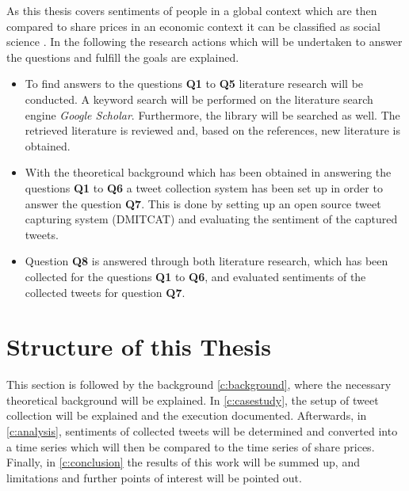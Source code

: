As this thesis covers sentiments of people in a global context which are then compared to share prices in an economic context it can be classified as social science \citep{Recker2013}.
In the following the research actions which will be undertaken to answer the questions and fulfill the goals are explained.

\begin{itemize}
	\item To find answers to the questions \textbf{Q1} to \textbf{Q5} literature research will be conducted.
	A keyword search will be performed on the literature search engine \emph{Google Scholar}.
	Furthermore, the library will be searched as well.
	The retrieved literature is reviewed and, based on the references, new literature is obtained.
	
	\item With the theoretical background which has been obtained in answering the questions \textbf{Q1} to \textbf{Q6} a tweet collection system has been set up in order to answer the question \textbf{Q7}.
	This is done by setting up an open source tweet capturing system (\ac{DMITCAT}) and evaluating the sentiment of the captured tweets.
	
	\item Question \textbf{Q8} is answered through both literature research, which has been collected for the questions \textbf{Q1} to \textbf{Q6}, and evaluated sentiments of the collected tweets for question \textbf{Q7}.
\end{itemize}

\section{Structure of this Thesis}
\label{s:introduction-structureofthisthesis}

This section is followed by the background \cref{c:background}, where the necessary theoretical background will be explained. 
In \cref{c:casestudy}, the setup of tweet collection will be explained and the execution documented.
Afterwards, in \cref{c:analysis}, sentiments of collected tweets will be determined and converted into a time series which will then be compared to the time series of share prices.
Finally, in \cref{c:conclusion} the results of this work will be summed up, and limitations and further points of interest will be pointed out.